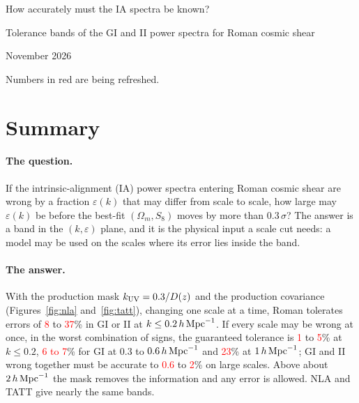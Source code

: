 \documentclass[11pt]{article}
\newcommand{\hMpc}{\,h\,{\rm Mpc}^{-1}}
\newcommand{\kuv}{k_{\rm UV}}
\newif\ifnumbersfinal
\newcommand{\refresh}[1]{\ifnumbersfinal#1\else\textcolor{red}{#1}\fi}
\newcommand{\SingleLowLo}{\refresh{8}}     %
\newcommand{\SingleLowHi}{\refresh{37}}
\newcommand{\JointLowLo}{\refresh{1}}
\newcommand{\JointLowHi}{\refresh{5}}
\newcommand{\JointBothLo}{\refresh{0.6}}   %
\newcommand{\JointBothHi}{\refresh{2}}
\newcommand{\JointMidGI}{\refresh{6 to 7}} %
\newcommand{\JointOneGI}{\refresh{23}}     %
\newcommand{\Threshold}{0.3}
\begin{document}
\begin{center}
  {\LARGE How accurately must the IA spectra be known?\par}
  \vspace{0.6em}
  {\large Tolerance bands of the GI and II power spectra for Roman cosmic
    shear\par}
  \vspace{0.6em}
  {\large November 2026\par}
  \ifnumbersfinal\else
    \vspace{0.6em}
    {\color{red}Numbers in red are being refreshed.\par}
  \fi
\end{center}
\vspace{1em}

\section{Summary}
\label{sec:summary}

\paragraph{The question.}
If the intrinsic-alignment (IA) power spectra entering Roman cosmic shear
are wrong by a fraction $\varepsilon(k)$ that may differ from scale to
scale, how large may $\varepsilon(k)$ be before the best-fit $(\Omega_m,
S_8)$ moves by more than $\Threshold\,\sigma$? The answer is a band in the
$(k, \varepsilon)$ plane, and it is the physical input a scale cut needs:
a model may be used on the scales where its error lies inside the band.

\paragraph{The answer.}
With the production mask $\kuv = 0.3/D(z)$ and the production covariance
(Figures~\ref{fig:nla} and~\ref{fig:tatt}), changing one scale at a time,
Roman tolerates errors of \SingleLowLo{} to \SingleLowHi\% in GI or II at
$k \le 0.2\hMpc$. If every scale may be wrong at once, in the worst
combination of signs, the guaranteed tolerance is \JointLowLo{} to
\JointLowHi\% at $k \le 0.2$, \JointMidGI\% for GI at 0.3 to $0.6\hMpc$ and
\JointOneGI\% at $1\hMpc$; GI and II wrong together must be accurate to
\JointBothLo{} to \JointBothHi\% on large scales. Above about $2\hMpc$
the mask removes the information and any error is allowed. NLA and TATT
give nearly the same bands.
\end{document}
